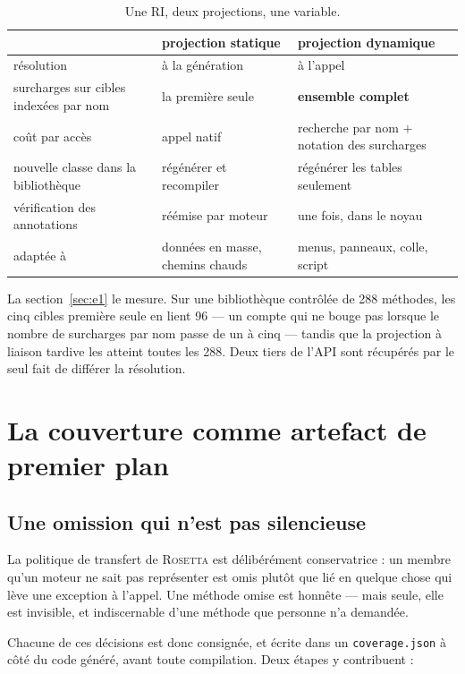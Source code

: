 \documentclass[11pt,a4paper]{article}
\newcommand{\rosetta}{\textsc{Rosetta}}
\newcommand{\code}[1]{\texttt{\small #1}}
\begin{document}
\begin{table}[h]
\centering\small
\begin{tabular}{lll}
\toprule
 & projection statique & projection dynamique \\
\midrule
résolution & à la génération & à l'appel \\
surcharges sur cibles indexées par nom & la première seule & \textbf{ensemble complet} \\
coût par accès & appel natif & recherche par nom $+$ notation des surcharges \\
nouvelle classe dans la bibliothèque & régénérer et recompiler & régénérer les tables seulement \\
vérification des annotations & réémise par moteur & une fois, dans le noyau \\
adaptée à & données en masse, chemins chauds & menus, panneaux, colle, script \\
\bottomrule
\end{tabular}
\caption{Une RI, deux projections, une variable.}
\label{tab:projections}
\end{table}

La section~\ref{sec:e1} le mesure. Sur une bibliothèque contrôlée de 288
méthodes, les cinq cibles \og première seule \fg{} en lient 96 --- un compte qui
ne bouge pas lorsque le nombre de surcharges par nom passe de un à cinq ---
tandis que la projection à liaison tardive les atteint toutes les 288. Deux tiers
de l'API sont récupérés par le seul fait de différer la résolution.

\section{La couverture comme artefact de premier plan}
\label{sec:coverage}

\subsection{Une omission qui n'est pas silencieuse}

La politique de transfert de \rosetta{} est délibérément conservatrice : un
membre qu'un moteur ne sait pas représenter est omis plutôt que lié en quelque
chose qui lève une exception à l'appel. Une méthode omise est honnête --- mais
seule, elle est invisible, et indiscernable d'une méthode que personne n'a
demandée.

Chacune de ces décisions est donc consignée, et écrite dans un
\code{coverage.json} à côté du code généré, avant toute compilation. Deux étapes
y contribuent :
\end{document}
